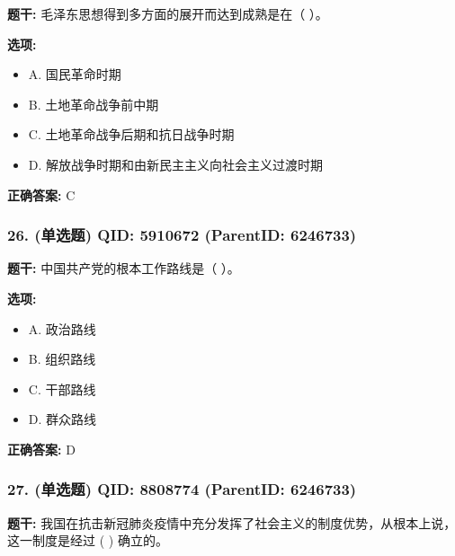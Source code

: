 \documentclass[12pt,UTF8]{ctexart}
\begin{document}
\textbf{题干:}
毛泽东思想得到多方面的展开而达到成熟是在（ ）。



\textbf{选项:}
\begin{itemize}[leftmargin=*]

  \item A. 国民革命时期

  \item B. 土地革命战争前中期

  \item C. 土地革命战争后期和抗日战争时期

  \item D. 解放战争时期和由新民主主义向社会主义过渡时期

\end{itemize}

\textbf{正确答案:}
C

\vspace{0.3em}\hrulefill\vspace{0.7em}

\subsubsection*{26. (单选题) \small QID: 5910672 (ParentID: 6246733)}

\textbf{题干:}
中国共产党的根本工作路线是（ ）。



\textbf{选项:}
\begin{itemize}[leftmargin=*]

  \item A. 政治路线

  \item B. 组织路线

  \item C. 干部路线

  \item D. 群众路线

\end{itemize}

\textbf{正确答案:}
D

\vspace{0.3em}\hrulefill\vspace{0.7em}

\subsubsection*{27. (单选题) \small QID: 8808774 (ParentID: 6246733)}

\textbf{题干:}
我国在抗击新冠肺炎疫情中充分发挥了社会主义的制度优势，从根本上说，这一制度是经过 ( ) 确立的。
\end{document}
